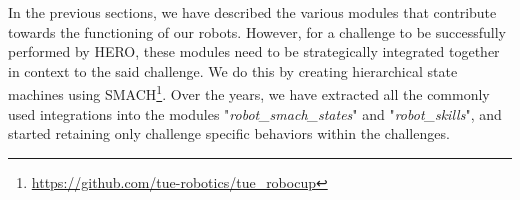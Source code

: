 In the previous sections, we have described the various modules that contribute towards the functioning of our robots.
However, for a challenge to be successfully performed by HERO, these modules need to be strategically integrated together in context to the said challenge.
We do this by creating hierarchical state machines using SMACH\footnote{\url{https://github.com/tue-robotics/tue_robocup}}.
Over the years, we have extracted all the commonly used integrations into the modules "\emph{robot\_smach\_states}" and "\emph{robot\_skills}", and started retaining only challenge specific behaviors within the challenges.